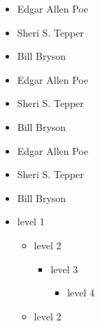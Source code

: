 \begin{itemize}

\item Edgar Allen Poe

\item Sheri S. Tepper

\item Bill Bryson

\end{itemize}


\begin{itemize}

\item Edgar Allen Poe

\item Sheri S. Tepper

\item Bill Bryson

\end{itemize}


\begin{itemize}

\item Edgar Allen Poe

\item Sheri S. Tepper

\item Bill Bryson

\end{itemize}


\begin{itemize}

\item level 1

\begin{itemize}

\item level 2

\begin{itemize}

\item level 3

\begin{itemize}

\item level 4

\end{itemize}

\end{itemize}

\item level 2

\end{itemize}

\end{itemize}


